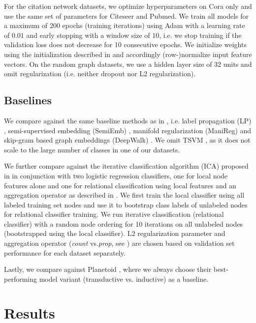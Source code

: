 \documentclass{article} %
\makeatletter
\newcommand*{\ie}{i.e.\@\xspace}
\newcommand*{\vs}{vs.\@\xspace}
\makeatother
\begin{document}
For the citation network datasets, we optimize hyperparameters on Cora only and use the same set of parameters for Citeseer and Pubmed. We train all models for a maximum of 200 epochs (training iterations) using Adam \citep{kingma2014adam} with a learning rate of $0.01$ and early stopping with a window size of $10$, \ie we stop training if the validation loss does not decrease for 10 consecutive epochs. We initialize weights using the initialization described in \cite{glorot2010understanding} and accordingly (row-)normalize input feature vectors. On the random graph datasets, we use a hidden layer size of 32 units and omit regularization (\ie neither dropout nor L2 regularization).

\subsection{Baselines}

We compare against the same baseline methods as in \cite{yang2016revisiting}, \ie label propagation (LP) \citep{zhu2003semi}, semi-supervised embedding (SemiEmb) \citep{weston2012deep}, manifold regularization (ManiReg) \citep{belkin2006manifold} and skip-gram based graph embeddings (DeepWalk) \citep{perozzi2014deepwalk}. We omit TSVM \citep{joachims1999transductive}, as it does not scale to the large number of classes in one of our datasets.

We further compare against the iterative classification algorithm (ICA) proposed in \cite{lu2003link} in conjunction with two logistic regression classifiers, one for local node features alone and one for relational classification using local features and an aggregation operator as described in \cite{sen2008collective}. We first train the local classifier using all labeled training set nodes and use it to bootstrap class labels of unlabeled nodes for relational classifier training. We run iterative classification (relational classifier) with a random node ordering for 10 iterations on all unlabeled nodes (bootstrapped using the local classifier). L2 regularization parameter and aggregation operator (\textit{count} \vs \textit{prop}, see \cite{sen2008collective}) are chosen based on validation set performance for each dataset separately.

Lastly, we compare against Planetoid \citep{yang2016revisiting}, where we always choose their best-performing model variant (transductive \vs inductive) as a baseline.

\section{Results}
\label{sec:results}
\end{document}
